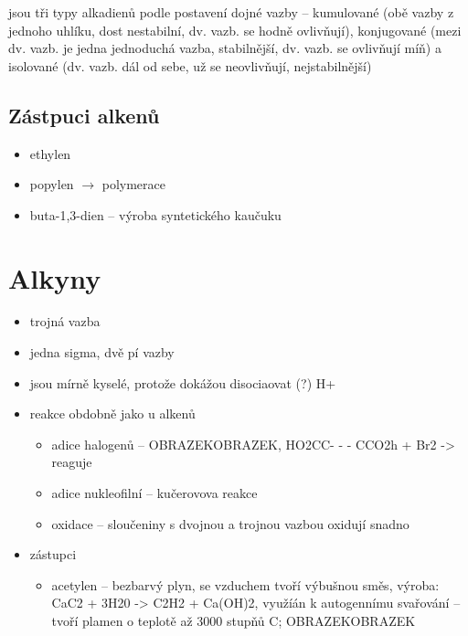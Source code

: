 \documentclass{article}
\begin{document}
jsou tři typy alkadienů podle postavení dojné vazby -- kumulované (obě vazby z jednoho uhlíku, dost nestabilní, dv. vazb. se hodně ovlivňují), konjugované (mezi dv. vazb. je jedna jednoduchá vazba, stabilnější, dv. vazb. se ovlivňují míň) a isolované (dv. vazb. dál od sebe, už se neovlivňují, nejstabilnější)

\subsection{Zástpuci alkenů}
\begin{itemize}
  \item ethylen
  \item popylen $\rightarrow$ polymerace
  \item buta-1,3-dien -- výroba syntetického kaučuku
\end{itemize}

\section{Alkyny}
\begin{itemize}
  \item trojná vazba
  \item jedna sigma, dvě pí vazby
  \item jsou mírně kyselé, protože dokážou disociaovat (?) H+
  \item reakce obdobně jako u alkenů
  \begin{itemize}
    \item adice halogenů --  OBRAZEKOBRAZEK, HO2CC- - - CCO2h + Br2 -> reaguje
    \item adice nukleofilní -- kučerovova reakce
    \item oxidace -- sloučeniny s dvojnou a trojnou vazbou oxidují snadno
  \end{itemize}
  \item zástupci
  \begin{itemize}
    \item acetylen -- bezbarvý plyn, se vzduchem tvoří výbušnou směs, výroba: CaC2 + 3H20 -> C2H2 + Ca(OH)2, využíán k autogennímu svařování -- tvoří plamen o teplotě až 3000 stupňů C; OBRAZEKOBRAZEK
  \end{itemize}
\end{itemize}
\end{document}
